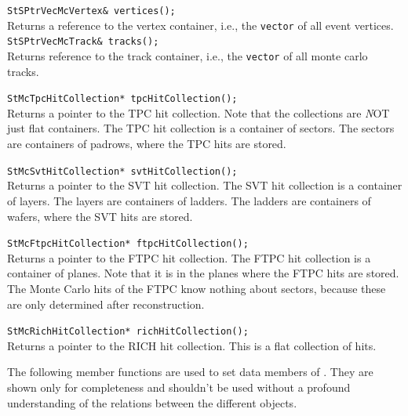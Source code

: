 \begin{Entry}
    \verb+StSPtrVecMcVertex& vertices();+\\
    Returns a reference to the vertex container, i.e., the {\tt vector} of all
    event vertices.
    \verb+StSPtrVecMcTrack& tracks();+\\
    Returns reference to the track container, i.e., the {\tt vector} of all
    monte carlo tracks.

    \verb+StMcTpcHitCollection* tpcHitCollection();+\\ 
    Returns a pointer to the TPC hit collection.  Note that the
    collections are {\emph NOT} just flat containers.  The TPC hit
    collection is a container of sectors.  The sectors are containers
    of padrows, where the TPC hits are stored.

    \verb+StMcSvtHitCollection* svtHitCollection();+\\
    Returns a pointer to the SVT hit collection.  The SVT hit
    collection is a container of layers.  The layers are containers
    of ladders.  The ladders are containers of wafers,
    where the SVT hits are stored.


    \verb+StMcFtpcHitCollection* ftpcHitCollection();+\\
    Returns a pointer to the FTPC hit collection. The FTPC hit
    collection is a container of planes.  Note that it is in the planes 
    where the FTPC hits are stored.  The Monte Carlo hits of the FTPC
    know nothing about sectors, because these are only determined
    after reconstruction.

    \verb+StMcRichHitCollection* richHitCollection();+\\
    Returns a pointer to the RICH hit collection. This is a flat collection
    of hits.

    The following member functions are used to set data members of .
    They are shown only for completeness and shouldn't be used without
    a profound understanding of the relations between the different objects.


\end{Entry}
